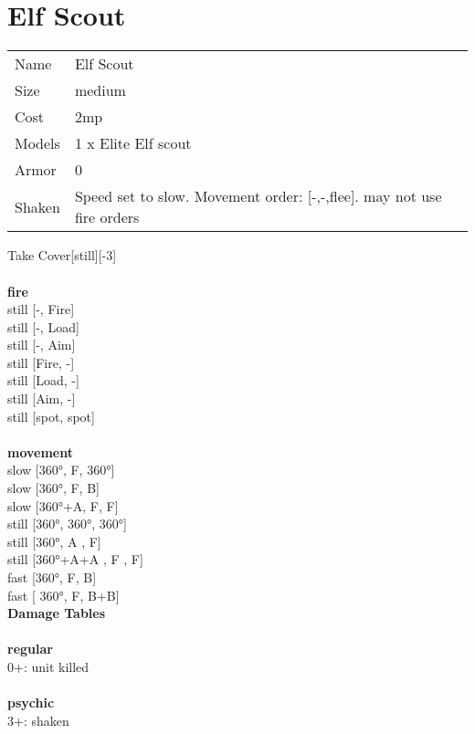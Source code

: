 \ \\
 
\ \\













\clearpage

\section{ Elf Scout }

\begin{tabular}{ll}
  Name & Elf Scout \\
  Size & medium\\
  Cost & 2mp\\
  Models & 1 x Elite Elf scout\\
  Armor & 0\\
  Shaken & Speed set to slow. Movement order: [-,-,flee]. may not use fire orders\\
\end{tabular}

\noindent Take Cover[still][-3]\\ 


\ \\ {\bf fire } \\
still [-, Fire] \\
still [-, Load] \\
still [-, Aim] \\
still [Fire, -] \\
still [Load, -] \\
still [Aim, -] \\
still [spot, spot] \\
\ \\ {\bf movement } \\
slow [360°, F, 360°] \\
slow [360°, F, B] \\
slow [360°+A, F, F] \\
still [360°, 360°, 360°] \\
still [360°, A , F] \\
still [360°+A+A , F , F] \\
fast [360°, F, B] \\
fast [ 360°,  F, B+B] \\


{\bf Damage Tables} \\
\ \\ {\bf regular } \\
0+: unit killed \\
\ \\ {\bf psychic } \\
3+: shaken \\


